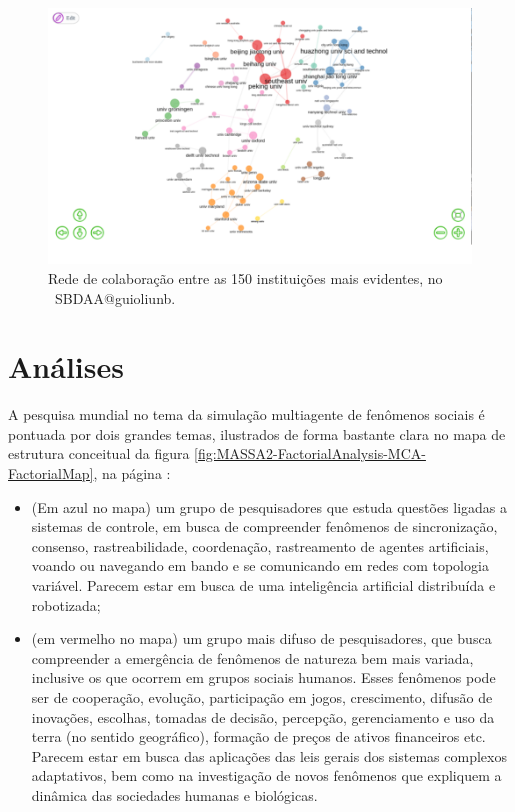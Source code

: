 \begin{figure}
    \centering
    \includegraphics[width=1\textwidth]{experiments/jhcf/PesqBibliogr/SimulacaoMultiagente/WoS-20220203/Estrutura/Social/MASSA2-Collaboration-Network-150instit.png}
    \caption{Rede de colaboração entre as 150 instituições mais evidentes, no  \dataset\ SBDAA@guioliunb.}
    \label{fig:MASSA2-Collaboration-Network-150instit}
\end{figure}


\section{Análises\label{MASSA2:Analises}}

A pesquisa mundial no tema da simulação multiagente de fenômenos sociais é pontuada por dois grandes temas, ilustrados de forma bastante clara no mapa de estrutura conceitual da figura \ref{fig:MASSA2-FactorialAnalysis-MCA-FactorialMap}, na página \pageref{fig:MASSA2-FactorialAnalysis-MCA-FactorialMap}:
\begin{itemize}
    \item 
(Em azul no mapa) um grupo de pesquisadores que estuda questões ligadas a sistemas de controle, em busca de compreender fenômenos de sincronização, consenso, rastreabilidade, coordenação, rastreamento de agentes artificiais, voando ou navegando em bando e se comunicando em redes com topologia variável. Parecem estar em busca de uma inteligência artificial distribuída e robotizada;
\item (em vermelho no mapa) um grupo mais difuso de pesquisadores, que busca compreender a emergência de fenômenos de natureza bem mais variada, inclusive os que ocorrem em grupos sociais humanos. Esses fenômenos pode ser de cooperação, evolução, participação em jogos, crescimento, difusão de inovações, escolhas, tomadas de decisão, percepção, gerenciamento e uso da terra (no sentido geográfico), formação de preços de ativos financeiros etc. Parecem estar em busca das aplicações das leis gerais dos sistemas complexos adaptativos, bem como na investigação de novos fenômenos que expliquem a dinâmica das sociedades humanas e biológicas.
\end{itemize}

